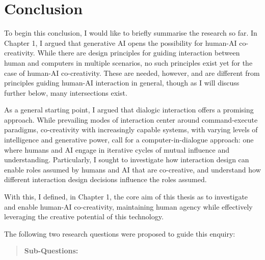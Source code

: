 
\chapter[Conclusion]{Conclusion}\label{c:conclusion}

To begin this conclusion, I would like to briefly summarise the research so far. In Chapter 1, I argued that generative AI opens the possibility for human-AI co-creativity. While there are design principles for guiding interaction between human and computers in multiple scenarios, no such principles exist yet for the case of human-AI co-creativity. These are needed, however, and are different from principles guiding human-AI interaction in general, though as I will discuss further below, many intersections exist.

As a general starting point, I argued that dialogic interaction offers a promising approach. While prevailing modes of interaction center around command-execute paradigms, co-creativity with increasingly capable systems, with varying levels of intelligence and generative power, call for a computer-in-dialogue approach: one where humans and AI engage in iterative cycles of mutual influence and understanding. Particularly, I sought to investigate how interaction design can enable roles assumed by humans and AI that are co-creative, and understand how different interaction design decisions influence the roles assumed.

With this, I defined, in Chapter 1, the core aim of this thesis as to investigate and enable human-AI co-creativity, maintaining human agency while effectively leveraging the creative potential of this technology.

The following two research questions were proposed to guide this enquiry:

\begin{quote}
\textbf{Sub-Questions:}
\end{quote}

